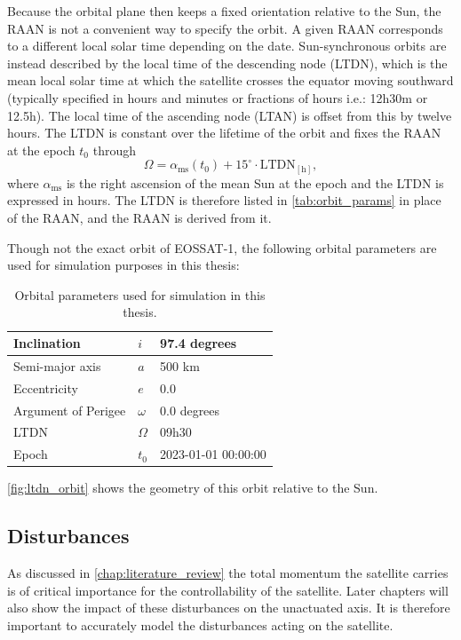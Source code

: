 Because the orbital plane then keeps a fixed orientation relative to the Sun, the RAAN is not a convenient way to specify the orbit. A given RAAN corresponds to a different local solar time depending on the date. Sun-synchronous orbits are instead described by the local time of the descending node (LTDN), which is the mean local solar time at which the satellite crosses the equator moving southward (typically specified in hours and minutes or fractions of hours i.e.: 12h30m or 12.5h). The local time of the ascending node (LTAN) is offset from this by twelve hours. The LTDN is constant over the lifetime of the orbit and fixes the RAAN at the epoch $t_0$ through
\begin{equation}
    \Omega = \alpha_{\text{ms}}(t_0) + 15^\circ \cdot \text{LTDN}_{[\text{h}]},
\end{equation}
where $\alpha_{\text{ms}}$ is the right ascension of the mean Sun at the epoch and the LTDN is expressed in hours. The LTDN is therefore listed in \autoref{tab:orbit_params} in place of the RAAN, and the RAAN is derived from it.

Though not the exact orbit of EOSSAT-1, the following orbital parameters are used for simulation purposes in this thesis:


\begingroup
\begin{table}[H]
    \centering
    \begin{tabular}{@{}p{4.5cm} l l}
        \hline
        Inclination & $i$ & 97.4 degrees \\
        \hline
        Semi-major axis & $a$ & 500 km \\
        \hline
        Eccentricity & $e$ & 0.0 \\
        \hline
        Argument of Perigee & $\omega$ & 0.0 degrees \\
        \hline
        LTDN & $\Omega$ & 09h30 \\
        \hline
        Epoch & $t_0$ & 2023-01-01 00:00:00 \\
        \hline
    \end{tabular}
\caption{Orbital parameters used for simulation in this thesis.}
\label{tab:orbit_params}
\end{table}
\endgroup

\autoref{fig:ltdn_orbit} shows the geometry of this orbit relative to the Sun.


\vspace{1cm}


\subsection{Disturbances}
As discussed in \autoref{chap:literature_review} the total momentum the satellite carries is of critical importance for the controllability of the satellite. Later chapters will also show the impact of these disturbances on the unactuated axis.  It is therefore important to accurately model the disturbances acting on the satellite.


